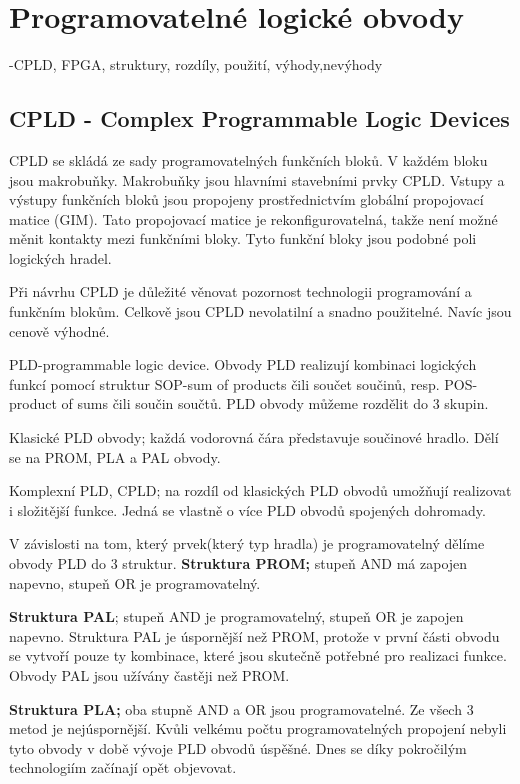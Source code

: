 \section{Programovatelné logické obvody}
-CPLD, FPGA, struktury, rozdíly, použití, výhody,nevýhody
\subsection{CPLD - Complex Programmable Logic Devices}
CPLD se skládá ze sady programovatelných funkčních bloků. V každém bloku jsou makrobuňky. Makrobuňky jsou hlavními stavebními prvky CPLD. Vstupy a výstupy funkčních bloků jsou propojeny prostřednictvím globální propojovací matice (GIM). Tato propojovací matice je rekonfigurovatelná, takže není možné měnit kontakty mezi funkčními bloky. Tyto funkční bloky jsou podobné poli logických hradel.

Při návrhu CPLD je důležité věnovat pozornost technologii programování a funkčním blokům. Celkově jsou CPLD nevolatilní a snadno použitelné. Navíc jsou cenově výhodné.

PLD-programmable logic device. Obvody PLD realizují kombinaci logických funkcí
pomocí struktur SOP-sum of products čili součet součinů, resp. POS-product of sums čili
součin součtů. PLD obvody můžeme rozdělit do 3 skupin.

Klasické PLD obvody; každá vodorovná čára představuje součinové hradlo. Dělí se na
PROM, PLA a PAL obvody.

Komplexní PLD, CPLD; na rozdíl od klasických PLD obvodů umožňují realizovat i
složitější funkce. Jedná se vlastně o více PLD obvodů spojených dohromady.

V závislosti na tom, který prvek(který typ hradla) je
programovatelný dělíme obvody PLD do 3 struktur.
\textbf{Struktura PROM;} stupeň AND má zapojen napevno, stupeň OR je programovatelný.

\textbf{Struktura PAL}; stupeň AND je programovatelný, stupeň OR je zapojen napevno.
Struktura PAL je úspornější než PROM, protože v první části obvodu se vytvoří pouze ty
kombinace, které jsou skutečně potřebné pro realizaci funkce. Obvody PAL jsou užívány
častěji než PROM.

\textbf{Struktura PLA;} oba stupně AND a OR jsou programovatelné. Ze všech 3 metod je
nejúspornější. Kvůli velkému počtu programovatelných propojení nebyli tyto obvody
v době vývoje PLD obvodů úspěšné. Dnes se díky pokročilým technologiím začínají opět
objevovat.

